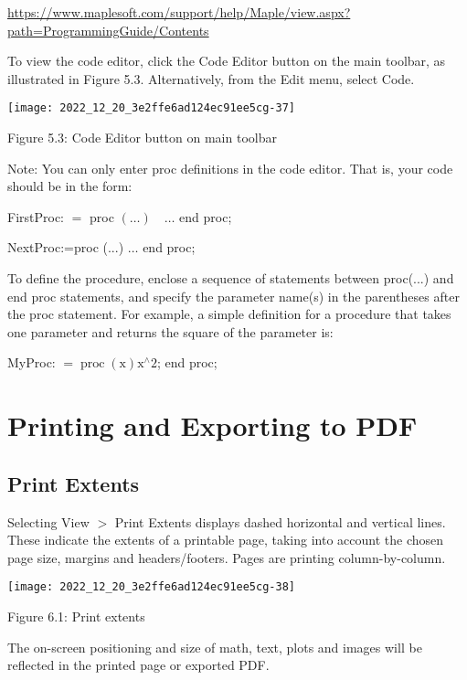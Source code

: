 \href{https://www.maplesoft.com/support/help/Maple/view.aspx?path=ProgrammingGuide/Contents}{https://www.maplesoft.com/support/help/Maple/view.aspx?path=ProgrammingGuide/Contents}

To view the code editor, click the Code Editor button on the main toolbar, as illustrated in Figure 5.3. Alternatively, from the Edit menu, select Code.

\begin{center}
\texttt{[image: 2022\_12\_20\_3e2ffe6ad124ec91ee5cg-37]}
\end{center}

Figure 5.3: Code Editor button on main toolbar

Note: You can only enter proc definitions in the code editor. That is, your code should be in the form:

FirstProc: $=$ proc $(\ldots) \quad \ldots$ end proc;

NextProc:=proc (...) $\ldots$ end proc;

To define the procedure, enclose a sequence of statements between proc(...) and end proc statements, and specify the parameter name(s) in the parentheses after the proc statement. For example, a simple definition for a procedure that takes one parameter and returns the square of the parameter is:

MyProc: $=\operatorname{proc}(\mathrm{x}) \mathrm{x}^{\wedge} 2$; end proc;

\section{Printing and Exporting to PDF}
\subsection{Print Extents}
Selecting View $>$ Print Extents displays dashed horizontal and vertical lines. These indicate the extents of a printable page, taking into account the chosen page size, margins and headers/footers. Pages are printing column-by-column.

\begin{center}
\texttt{[image: 2022\_12\_20\_3e2ffe6ad124ec91ee5cg-38]}
\end{center}

Figure 6.1: Print extents

The on-screen positioning and size of math, text, plots and images will be reflected in the printed page or exported PDF.

